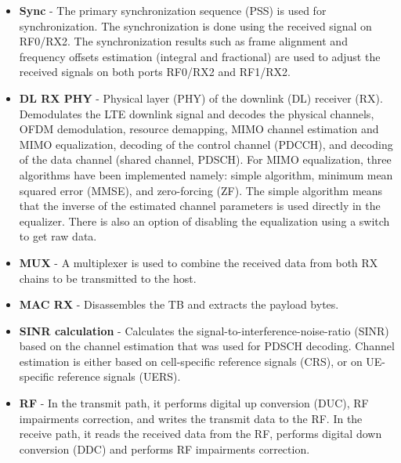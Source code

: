 \begin{itemize}
    \item \textbf{Sync} -
        The primary synchronization sequence (PSS) is used for synchronization. The synchronization is done using the received signal on RF0/RX2. The synchronization results such as frame alignment and frequency offsets estimation (integral and fractional) are used to adjust the received signals on both ports RF0/RX2 and RF1/RX2.
    \item \textbf{DL RX PHY} -
        Physical layer (PHY) of the downlink (DL) receiver (RX). Demodulates the LTE downlink signal and decodes the physical channels, OFDM demodulation, resource demapping, MIMO channel estimation and MIMO equalization, decoding of the control channel (PDCCH), and decoding of the data channel (shared channel, PDSCH). For MIMO equalization, three algorithms have been implemented namely: simple algorithm, minimum mean squared error (MMSE), and zero-forcing (ZF). The simple algorithm means that the inverse of the estimated channel parameters is used directly in the equalizer. There is also an option of disabling the equalization using a switch to get raw data.
    \item \textbf{MUX} -
        A multiplexer is used to combine the received data from both RX chains to be transmitted to the host.
    \item \textbf{MAC RX} -
        Disassembles the TB and extracts the payload bytes.
    \item \textbf{SINR calculation} -
        Calculates the signal-to-interference-noise-ratio (SINR) based on the channel estimation that was used for PDSCH decoding. Channel estimation is either based on cell-specific reference signals (CRS), or on UE-specific reference signals (UERS).
    \item \textbf{RF} -
        In the transmit path, it performs digital up conversion (DUC), RF impairments correction, and writes the transmit data to the RF. In the receive path, it reads the received data from the RF, performs digital down conversion (DDC) and performs RF impairments correction.
\end{itemize}


